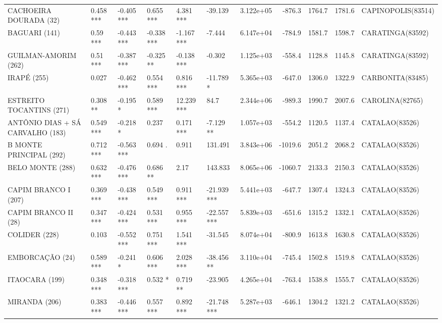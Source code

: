 \documentclass[12pt,oneside]{book}\usepackage[]{graphicx}\usepackage[]{color}
\newenvironment{knitrout}{}{} %
\theoremstyle{definition} %
\begin{document}
\begin{knitrout}
\begin{landscape}
\begin{table}
{\begin{tabular}[t]{llllllrrrrl}
CACHOEIRA DOURADA (32) & 0.458 *** & -0.405 *** & 0.655 *** & 4.381 *** & -39.139 & 3.122e+05 & -876.3 & 1764.7 & 1781.6 & CAPINOPOLIS(83514)\\
\rowcolor{gray!6}  BAGUARI (141) & 0.59 *** & -0.443 *** & -0.338 *** & -1.167 *** & -7.444 & 6.147e+04 & -784.9 & 1581.7 & 1598.7 & CARATINGA(83592)\\
GUILMAN-AMORIM (262) & 0.51 *** & -0.387 *** & -0.325 ** & -0.138 *** & -0.302 & 1.125e+03 & -558.4 & 1128.8 & 1145.8 & CARATINGA(83592)\\
\rowcolor{gray!6}  IRAPÉ (255) & 0.027 & -0.462 *** & 0.554 *** & 0.816 *** & -11.789 * & 5.365e+03 & -647.0 & 1306.0 & 1322.9 & CARBONITA(83485)\\
\addlinespace
ESTREITO TOCANTINS (271) & 0.308 ** & -0.195 * & 0.589 *** & 12.239 *** & 84.7 & 2.344e+06 & -989.3 & 1990.7 & 2007.6 & CAROLINA(82765)\\
\rowcolor{gray!6}  ANTÔNIO DIAS + SÁ CARVALHO (183) & 0.549 *** & -0.218 * & 0.237 & 0.171 *** & -7.129 ** & 1.057e+03 & -554.2 & 1120.5 & 1137.4 & CATALAO(83526)\\
B MONTE PRINCIPAL (292) & 0.712 *** & -0.563 *** & 0.694 . & 0.911 & 131.491 & 3.843e+06 & -1019.6 & 2051.2 & 2068.2 & CATALAO(83526)\\
\rowcolor{gray!6}  BELO MONTE (288) & 0.632 *** & -0.476 *** & 0.686 ** & 2.17 & 143.833 & 8.065e+06 & -1060.7 & 2133.3 & 2150.3 & CATALAO(83526)\\
CAPIM BRANCO I (207) & 0.369 *** & -0.438 *** & 0.549 *** & 0.911 *** & -21.939 *** & 5.441e+03 & -647.7 & 1307.4 & 1324.3 & CATALAO(83526)\\
\addlinespace
\rowcolor{gray!6}  CAPIM BRANCO II (28) & 0.347 *** & -0.424 *** & 0.531 *** & 0.955 *** & -22.557 *** & 5.839e+03 & -651.6 & 1315.2 & 1332.1 & CATALAO(83526)\\
COLIDER (228) & 0.103 & -0.552 *** & 0.751 *** & 1.541 *** & -31.545 & 8.074e+04 & -800.9 & 1613.8 & 1630.8 & CATALAO(83526)\\
\rowcolor{gray!6}  EMBORCAÇÃO (24) & 0.589 *** & -0.241 * & 0.606 *** & 2.028 *** & -38.456 ** & 3.110e+04 & -745.4 & 1502.8 & 1519.8 & CATALAO(83526)\\
ITAOCARA (199) & 0.348 *** & -0.318 *** & 0.532 * & 0.719 ** & -23.905 & 4.265e+04 & -763.4 & 1538.8 & 1555.7 & CATALAO(83526)\\
\rowcolor{gray!6}  MIRANDA (206) & 0.383 *** & -0.446 *** & 0.557 *** & 0.892 *** & -21.748 *** & 5.287e+03 & -646.1 & 1304.2 & 1321.2 & CATALAO(83526)\\

\end{tabular}}
\end{table}
\end{landscape}
\end{knitrout}
\end{document}
